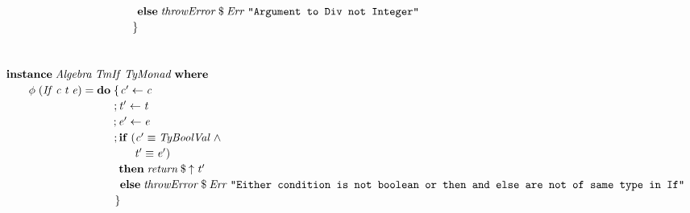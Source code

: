 \documentclass[10pt]{article}
\newcommand{\Conid}[1]{\mathit{#1}}
\newcommand{\Varid}[1]{\mathit{#1}}
\begin{document}
\begin{tabbing}
${\hskip1.00em\relax\hskip2.00em\relax\phantom{\Varid{\phi}\;(\Conid{TmDiv}\;\Varid{x}\;\Varid{y})\mathrel{=}\mathbf{do}\;\mbox{}}\phantom{;\mbox{}}\mathbf{else}\;\Varid{throwError}\mathbin{\$}\Conid{Err}\;\text{\tt \char34 Argument~to~Div~not~Integer\char34}}$\\
${\hskip1.00em\relax\hskip2.00em\relax\phantom{\Varid{\phi}\;(\Conid{TmDiv}\;\Varid{x}\;\Varid{y})\mathrel{=}\mathbf{do}\;\mbox{}}\mskip1.5mu\}}$\\
${}$\\
${}$\\
${\hskip1.00em\relax\mathbf{instance}\;\Conid{Algebra}\;\Conid{TmIf}\;\Conid{TyMonad}\;\mathbf{where}}$\\
${\hskip1.00em\relax\hskip2.00em\relax\Varid{\phi}\;(\Conid{If}\;\Varid{c}\;\Varid{t}\;\Varid{e})\mathrel{=}\mathbf{do}\;\{\mskip1.5mu \Varid{c'}\leftarrow \Varid{c}}$\\
${\hskip1.00em\relax\hskip2.00em\relax\phantom{\Varid{\phi}\;(\Conid{If}\;\Varid{c}\;\Varid{t}\;\Varid{e})\mathrel{=}\mathbf{do}\;\mbox{}};\Varid{t'}\leftarrow \Varid{t}}$\\
${\hskip1.00em\relax\hskip2.00em\relax\phantom{\Varid{\phi}\;(\Conid{If}\;\Varid{c}\;\Varid{t}\;\Varid{e})\mathrel{=}\mathbf{do}\;\mbox{}};\Varid{e'}\leftarrow \Varid{e}}$\\
${\hskip1.00em\relax\hskip2.00em\relax\phantom{\Varid{\phi}\;(\Conid{If}\;\Varid{c}\;\Varid{t}\;\Varid{e})\mathrel{=}\mathbf{do}\;\mbox{}};\mathbf{if}\;(\Varid{c'}\equiv \Conid{TyBoolVal}\mathrel{\wedge}}$\\
${\hskip1.00em\relax\hskip2.00em\relax\phantom{\Varid{\phi}\;(\Conid{If}\;\Varid{c}\;\Varid{t}\;\Varid{e})\mathrel{=}\mathbf{do}\;\mbox{}}\phantom{;\mathbf{if}\;(\mbox{}}\Varid{t'}\equiv \Varid{e'})}$\\
${\hskip1.00em\relax\hskip2.00em\relax\phantom{\Varid{\phi}\;(\Conid{If}\;\Varid{c}\;\Varid{t}\;\Varid{e})\mathrel{=}\mathbf{do}\;\mbox{}}\phantom{;\mbox{}}\mathbf{then}\;\Varid{return}\mathbin{\$}\Varid{\uparrow}\;\Varid{t'}}$\\
${\hskip1.00em\relax\hskip2.00em\relax\phantom{\Varid{\phi}\;(\Conid{If}\;\Varid{c}\;\Varid{t}\;\Varid{e})\mathrel{=}\mathbf{do}\;\mbox{}}\phantom{;\mbox{}}\mathbf{else}\;\Varid{throwError}\mathbin{\$}\Conid{Err}\;\text{\tt \char34 Either~condition~is~not~boolean~or~then~and~else~are~not~of~same~type~in~If\char34}}$\\
${\hskip1.00em\relax\hskip2.00em\relax\phantom{\Varid{\phi}\;(\Conid{If}\;\Varid{c}\;\Varid{t}\;\Varid{e})\mathrel{=}\mathbf{do}\;\mbox{}}\mskip1.5mu\}}$\\

\end{tabbing}
\end{document}
